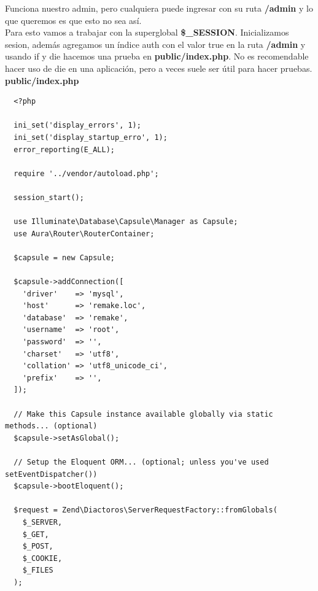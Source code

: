 \documentclass{article}
\begin{document}
Funciona nuestro admin, pero cualquiera puede ingresar con su ruta
\textbf{/admin} y lo que queremos es que esto no sea así.\\

Para esto vamos a trabajar con la superglobal \textbf{\$\_SESSION}.
Inicializamos sesion, además agregamos un índice auth con el valor true en la
ruta \textbf{/admin} y usando if y die hacemos una prueba en
\textbf{public/index.php}. No es recomendable hacer uso de die en una
aplicación, pero a veces suele ser útil para hacer pruebas.\\ 

\textbf{public/index.php}
\begin{verbatim}
  <?php

  ini_set('display_errors', 1);
  ini_set('display_startup_erro', 1);
  error_reporting(E_ALL);

  require '../vendor/autoload.php';

  session_start();

  use Illuminate\Database\Capsule\Manager as Capsule;
  use Aura\Router\RouterContainer;

  $capsule = new Capsule;

  $capsule->addConnection([
    'driver'    => 'mysql',
    'host'      => 'remake.loc',
    'database'  => 'remake',
    'username'  => 'root',
    'password'  => '',
    'charset'   => 'utf8',
    'collation' => 'utf8_unicode_ci',
    'prefix'    => '',
  ]);

  // Make this Capsule instance available globally via static methods... (optional)
  $capsule->setAsGlobal();

  // Setup the Eloquent ORM... (optional; unless you've used setEventDispatcher())
  $capsule->bootEloquent();

  $request = Zend\Diactoros\ServerRequestFactory::fromGlobals(
    $_SERVER,
    $_GET,
    $_POST,
    $_COOKIE,
    $_FILES
  );


\end{verbatim}
\end{document}

